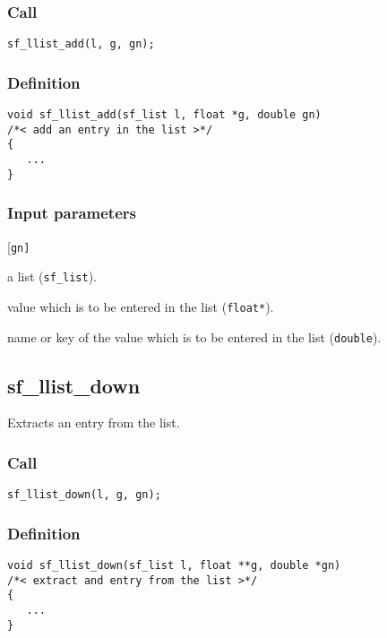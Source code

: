\subsubsection*{Call}
\begin{verbatim}sf_llist_add(l, g, gn);\end{verbatim}

\subsubsection*{Definition}
\begin{verbatim}
void sf_llist_add(sf_list l, float *g, double gn) 
/*< add an entry in the list >*/
{    
   ...
}
\end{verbatim}

\subsubsection*{Input parameters}
\begin{desclist}{\tt }{\quad}[\tt gn]
   \setlength\itemsep{0pt}
   \item[l] a list (\texttt{sf\_list}). 
   \item[g] value which is to be entered in the list (\texttt{float*}).  
   \item[gn] name or key of the value which is to be entered in the list (\texttt{double}).  
\end{desclist}




\subsection{{sf\_llist\_down}}
Extracts an entry from the list.

\subsubsection*{Call}
\begin{verbatim}sf_llist_down(l, g, gn);\end{verbatim}

\subsubsection*{Definition}
\begin{verbatim}
void sf_llist_down(sf_list l, float **g, double *gn)
/*< extract and entry from the list >*/
{
   ...
}
\end{verbatim}

